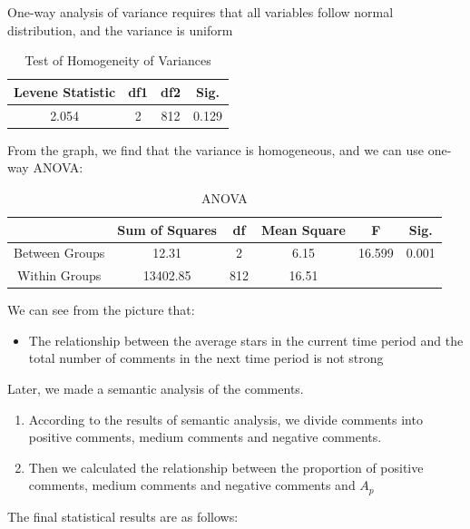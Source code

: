 \documentclass{mcmthesis}
\begin{document}
One-way analysis of variance requires that all variables follow normal distribution, and the variance is uniform\\
\begin{table}[H]
	\center
	\caption{Test of Homogeneity of Variances}
	\label{type}
	\begin{tabular}{c|c|c|c}
		\hline
		\textbf{Levene Statistic} & \textbf{df1}& \textbf{df2}& \textbf{Sig.} \\ \hline 
		2.054                     & 2           & 812         & 0.129         \\ \hline
	\end{tabular}
\end{table}
From the graph, we find that the variance is homogeneous, and we can use one-way ANOVA:\\
\begin{table}[H]
	\center
	\caption{ANOVA}
	\label{type}
	\begin{tabular}{c|c|c|c|c|c}
		\hline
		\textbf{ } & \textbf{Sum of Squares} & \textbf{df}& \textbf{Mean Square}& \textbf{F}&  \textbf{Sig.} \\ \hline 
		Between Groups                     & 12.31           & 2         & 6.15    &16.599 &0.001   \\ 
		Within Groups                     & 13402.85          & 812         & 16.51    &  & \\ \hline		
	\end{tabular}
\end{table}
We can see from the picture that:
\begin{itemize}
	\item The relationship between the average stars in the current time period and the total number of comments in the next time period is not strong
\end{itemize}
Later, we made a semantic analysis of the comments.
\begin{enumerate}
	\item According to the results of semantic analysis, we divide comments into positive comments, medium comments and negative comments.
	\item Then we calculated the relationship between the proportion of positive comments, medium comments and negative comments and $A_p $
\end{enumerate}
The final statistical results are as follows:\\
\end{document}
